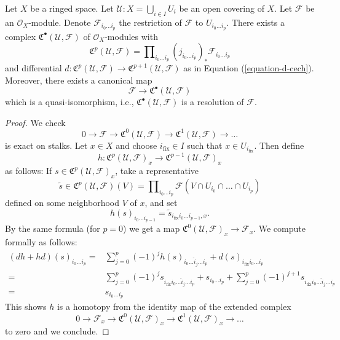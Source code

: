 \begin{lemma}
\label{lemma-covering-resolution}
Let $X$ be a ringed space. Let $\mathcal{U} : X = \bigcup_{i \in I} U_i$
be an open covering of $X$. Let $\mathcal{F}$ be an $\mathcal{O}_X$-module.
Denote $\mathcal{F}_{i_0 \ldots i_p}$ the restriction of
$\mathcal{F}$ to $U_{i_0 \ldots i_p}$. There exists a complex
${\mathfrak C}^\bullet(\mathcal{U}, \mathcal{F})$
of $\mathcal{O}_X$-modules with
$$
{\mathfrak C}^p(\mathcal{U}, \mathcal{F}) =
\prod\nolimits_{i_0 \ldots i_p}
(j_{i_0 \ldots i_p})_* \mathcal{F}_{i_0 \ldots i_p}
$$
and differential
$d : {\mathfrak C}^p(\mathcal{U}, \mathcal{F})
\to {\mathfrak C}^{p + 1}(\mathcal{U}, \mathcal{F})$
as in Equation (\ref{equation-d-cech}). Moreover, there exists a canonical
map
$$
\mathcal{F} \to {\mathfrak C}^\bullet(\mathcal{U}, \mathcal{F})
$$
which is a quasi-isomorphism, i.e.,
${\mathfrak C}^\bullet(\mathcal{U}, \mathcal{F})$
is a resolution of $\mathcal{F}$.
\end{lemma}

\begin{proof}
We check
$$
0 \to \mathcal{F} \to \mathfrak{C}^0(\mathcal{U}, \mathcal{F}) \to
\mathfrak{C}^1(\mathcal{U}, \mathcal{F}) \to  \ldots
$$
is exact on stalks. Let $x \in X$ and choose $i_{\text{fix}} \in I$
such that $x \in U_{i_{\text{fix}}}$. Then define 
$$
h : \mathfrak{C}^p(\mathcal{U}, \mathcal{F})_x
\to \mathfrak{C}^{p - 1}(\mathcal{U}, \mathcal{F})_x
$$
as follows: If $s \in \mathfrak{C}^p(\mathcal{U}, \mathcal{F})_x$, take
a representative
$$
\widetilde{s} \in
\mathfrak{C}^p(\mathcal{U}, \mathcal{F})(V) =
\prod\nolimits_{i_0 \ldots i_p}
\mathcal{F}(V \cap U_{i_0} \cap \ldots \cap U_{i_p})
$$
defined on some neighborhood $V$ of $x$, and set
$$
h(s)_{i_0 \ldots i_{p - 1}} =
\widetilde{s}_{i_{\text{fix}} i_0 \ldots i_{p - 1}, x}.
$$
By the same formula (for $p = 0$) we get a map
$\mathfrak{C}^{0}(\mathcal{U},\mathcal{F})_x \to \mathcal{F}_x$.
We compute formally as follows:
\begin{align*}
(dh + hd)(s)_{i_0 \ldots i_p}
= &
\sum\nolimits_{j = 0}^p
(-1)^j
h(s)_{i_0 \ldots \hat i_j \ldots i_p}
+
d(s)_{i_{\text{fix}} i_0 \ldots i_p}\\
= &
\sum\nolimits_{j = 0}^p
(-1)^j
s_{i_{\text{fix}} i_0 \ldots \hat i_j \ldots i_p}
+
s_{i_0 \ldots i_p}
+
\sum\nolimits_{j = 0}^p
(-1)^{j + 1}
s_{i_{\text{fix}} i_0 \ldots \hat i_j \ldots i_p} \\
= &
s_{i_0 \ldots i_p}
\end{align*}
This shows $h$ is a homotopy from the identity map of
the extended complex
$$
0 \to \mathcal{F}_x \to \mathfrak{C}^0(\mathcal{U}, \mathcal{F})_x
\to \mathfrak{C}^1(\mathcal{U}, \mathcal{F})_x \to \ldots
$$
to zero and we conclude.
\end{proof}

